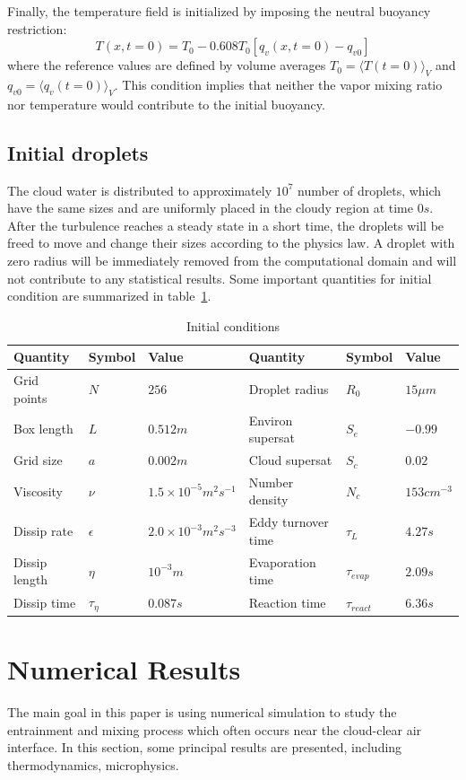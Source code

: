 \documentclass[12pt]{article}
\begin{document}
Finally, the temperature field is initialized by imposing the neutral buoyancy restriction:
\begin{equation}
T(x,t = 0) = T_0 - 0.608T_0[q_v(x,t = 0) - q_{v0}]
\end{equation}
where the reference values are defined by volume averages $T_0 = \langle T(t=0)\rangle_V$ and $q_{v0} = \langle q_v(t=0)\rangle_V$. This condition implies that neither the vapor mixing ratio nor temperature would contribute to the initial buoyancy.  
\subsection{Initial droplets}

The cloud water is distributed to approximately $10^{7}$ number of droplets, which have the same sizes and are uniformly placed in the cloudy region at time $0s$. After the turbulence reaches a steady state in a short time, the droplets will be freed to move and change their sizes according to the physics law. A droplet with zero radius will be immediately removed from the computational domain and will not contribute to any statistical results. Some important quantities for initial condition are summarized in table~\ref{tb:parameters}.
\begin{table}
\begin{tabular}{llllll}
\hline\hline
Quantity & Symbol & Value & Quantity & Symbol & Value\tabularnewline
\hline
Grid points & $N$ & $256$ & Droplet radius & $R_{0}$ & $15\mu m$\tabularnewline
\hline 
Box length & $L$ & $0.512m$ & Environ supersat & $S_{e}$ & $-0.99$\tabularnewline
\hline 
Grid size & $a$ & $0.002m$ & Cloud supersat & $S_{c}$ & $0.02$\tabularnewline
\hline 
Viscosity & $\nu$ & $1.5\times10^{-5}m^{2}s^{-1}$ & Number density& $N_{c}$ & $153cm^{-3}$\tabularnewline
\hline 
Dissip rate& $\epsilon$ & $2.0\times10^{-3}m^{2}s^{-3}$ & Eddy turnover time & $\tau_{L}$ & $4.27s$\tabularnewline
\hline 
Dissip length& $\eta$ & $10^{-3}m$ & Evaporation time & $\tau_{evap}$ & $2.09s$\tabularnewline
\hline 
Dissip time& $\tau_{\eta}$ & $0.087s$ & Reaction time & $\tau_{react}$ & $6.36s$\tabularnewline
\hline 
\end{tabular}
\caption{Initial conditions}\label{tb:parameters}
\end{table}
 
\section{Numerical Results}
The main goal in this paper is using numerical simulation to study
the entrainment and mixing process which often occurs near the cloud-clear air interface. In this section, some principal results are presented, including thermodynamics, microphysics.
\end{document}
